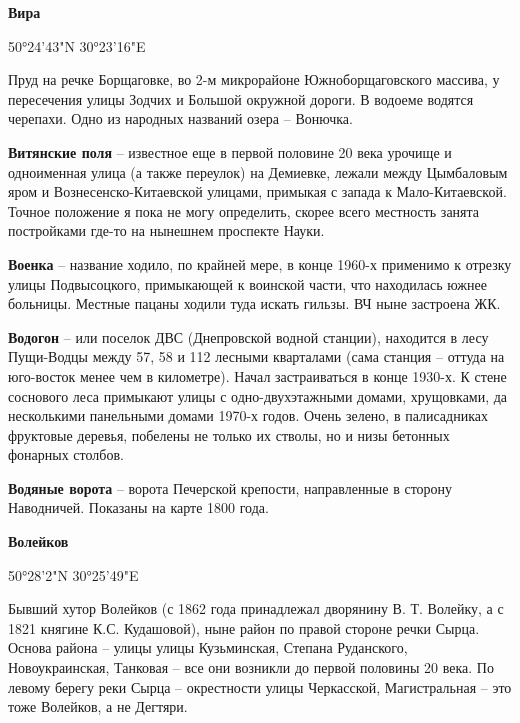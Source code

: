 \medskip

\textbf{Вира} 

50°24'43"N 30°23'16"E

Пруд на речке Борщаговке, во 2-м микрорайоне Южноборщаговского массива, у пересечения улицы Зодчих и Большой окружной дороги. В водоеме водятся черепахи. Одно из народных названий озера – Вонючка.\\

\medskip

\textbf{Витянские поля} – известное еще в первой половине 20 века урочище и одноименная улица (а также переулок) на Демиевке, лежали между Цымбаловым яром и Вознесенско-Китаевской улицами, примыкая с запада к Ма\-ло-Китаевской. Точное положение я пока не могу определить, скорее всего местность занята постройками где-то на нынешнем проспекте Науки.\\

\medskip

\textbf{Военка} – название ходило, по крайней мере, в конце 1960-х применимо к отрезку улицы Подвысоцкого, примыкающей к воинской части, что находилась южнее больницы. Местные пацаны ходили туда искать гильзы. ВЧ ныне застроена ЖК.\\ 

\medskip

\textbf{Водогон} – или поселок ДВС (Днепровской водной станции), находится в лесу Пущи-Вод\-цы между 57, 58 и 112 лесными кварталами (сама станция – оттуда на юго-восток менее чем в километре). Начал застраиваться в конце 1930-х. К стене соснового леса примыкают улицы с одно-двухэтажными домами, хрущовками, да несколькими панельными домами 1970-х годов. Очень зелено, в палисадниках фруктовые деревья, побелены не только их стволы, но и низы бетонных фонарных столбов.\\

\medskip

\textbf{Водяные ворота} – ворота Печерской крепости, направленные в сторону Наводничей. Показаны на карте 1800 года.\\

\medskip

\textbf{Волейков}

50°28'2"N 30°25'49"E

Бывший хутор Волейков (с 1862 года принадлежал дворянину В. Т. Волейку, а с 1821 княгине К.С. Кудашовой), ныне район по правой стороне речки Сырца. Основа района – улицы улицы Кузьминская, Степана Руданского, Новоукраинская, Танковая – все они возникли до первой половины 20 века. По левому берегу реки Сырца – окрестности улицы Черкасской, Магистральная – это тоже Волейков, а не Дегтяри.

